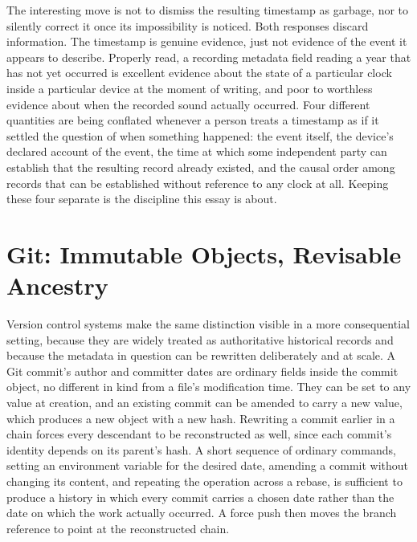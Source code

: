 \documentclass[11pt]{article}
\begin{document}
The interesting move is not to dismiss the resulting timestamp as garbage, nor to silently correct it once its impossibility is noticed. Both responses discard information. The timestamp is genuine evidence, just not evidence of the event it appears to describe. Properly read, a recording metadata field reading a year that has not yet occurred is excellent evidence about the state of a particular clock inside a particular device at the moment of writing, and poor to worthless evidence about when the recorded sound actually occurred. Four different quantities are being conflated whenever a person treats a timestamp as if it settled the question of when something happened: the event itself, the device's declared account of the event, the time at which some independent party can establish that the resulting record already existed, and the causal order among records that can be established without reference to any clock at all. Keeping these four separate is the discipline this essay is about.

\section{Git: Immutable Objects, Revisable Ancestry}

Version control systems make the same distinction visible in a more consequential setting, because they are widely treated as authoritative historical records and because the metadata in question can be rewritten deliberately and at scale. A Git commit's author and committer dates are ordinary fields inside the commit object, no different in kind from a file's modification time. They can be set to any value at creation, and an existing commit can be amended to carry a new value, which produces a new object with a new hash. Rewriting a commit earlier in a chain forces every descendant to be reconstructed as well, since each commit's identity depends on its parent's hash. A short sequence of ordinary commands, setting an environment variable for the desired date, amending a commit without changing its content, and repeating the operation across a rebase, is sufficient to produce a history in which every commit carries a chosen date rather than the date on which the work actually occurred. A force push then moves the branch reference to point at the reconstructed chain.
\end{document}
